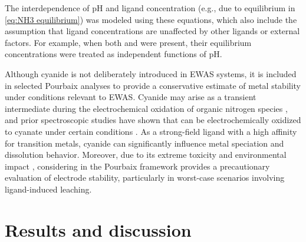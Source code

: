 \documentclass[journal=jacsat,manuscript=article]{achemso}
\begin{document}
The interdependence of pH and ligand concentration (e.g., due to  equilibrium in \ref{eq:NH3 equilibrium}) was modeled using these equations, which also include the assumption that ligand concentrations are unaffected by other ligands or external factors. For example, when both  and  were present, their equilibrium concentrations were treated as independent functions of pH.


Although cyanide is not deliberately introduced in EWAS systems, it is included in selected Pourbaix analyses to provide a conservative estimate of metal stability under conditions relevant to EWAS. Cyanide may arise as a transient intermediate during the electrochemical oxidation of organic nitrogen species \cite{Oraby2020GoldPermanganate, Chen2013AdsorptionStudy, Huerta1997ElectrochemicalPt111, Sandoval2011AdsorptionStudy}, and prior spectroscopic studies have shown that  can be electrochemically oxidized to cyanate under certain conditions \cite{Paulissen1992InfraredConditions, Hinman1986FourierElectrodes, Kitamura1986OxidationSpectroscopy, Chen2013AdsorptionStudy}.
As a strong-field ligand with a high affinity for transition metals, cyanide can significantly influence metal speciation and dissolution behavior. Moreover, due to its extreme toxicity and environmental impact \cite{xing2018simple, mekuto2016integrated, bruger2018volatilisation}, considering  in the Pourbaix framework provides a precautionary evaluation of electrode stability, particularly in worst-case scenarios involving ligand-induced leaching.


\section{Results and discussion}
\end{document}
